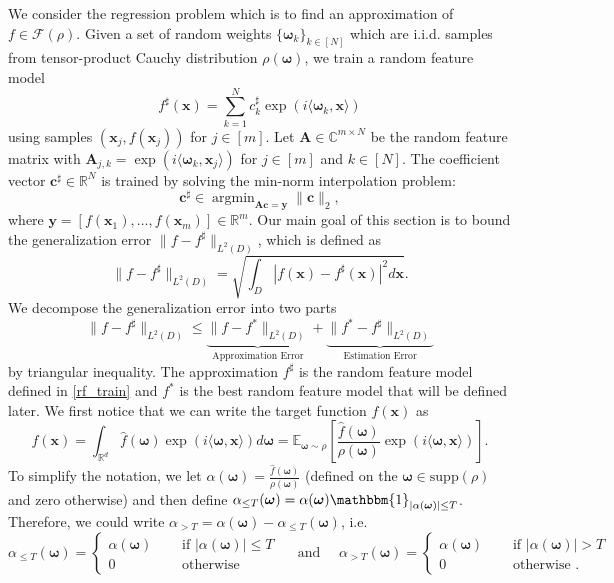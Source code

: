 \documentclass[11pt,twoside]{article}
\theoremstyle{plain}
\theoremstyle{definition}
\theoremstyle{remark}
\newcommand{\R}{\mathbb{R}}
\newcommand{\C}{\mathbb{C}}
\newcommand{\E}{\mathbb{E}}
\newcommand{\Ab}{\mathbf{A}}
\newcommand{\xb}{\mathbf{x}}
\newcommand{\yb}{\mathbf{y}}
\newcommand{\cb}{\mathbf{c}}
\newcommand{\Fc}{\mathcal{F}}
\newcommand{\argmin}{\mathop{\mathrm{argmin}}}
\newcommand{\indicator}{\mathbbm{1}}
\newcommand{\omegab}{\boldsymbol\omega}
\begin{document}
We consider the regression problem which is to find an approximation of $f\in\Fc(\rho)$. 
Given a set of random weights $\{ \omegab_k\}_{k\in[N]}$ which are i.i.d. samples from tensor-product Cauchy distribution $\rho(\omegab)$, we train a random feature model
\begin{equation}
\label{rf_train}
f^\sharp(\xb) = \sum_{k=1}^N c_k^\sharp \exp(i\langle \omegab_k,\xb\rangle)
\end{equation}
using samples $(\xb_j, f(\xb_j))$ for $j\in[m]$. 
Let $\Ab\in\C^{m\times N}$ be the random feature matrix with $\Ab_{j,k}=\exp(i\langle \omegab_k, \xb_j\rangle)$ for $j\in[m]$ and $k\in[N]$. The coefficient vector $\cb^\sharp\in\R^N$ is trained by solving the min-norm interpolation problem:
\begin{equation}
\cb^\sharp \in \argmin_{\Ab\cb = \yb} \|\cb\|_2,
\end{equation}
where $\yb = [f(\xb_1), \dots,f(\xb_m)]\in\R^m$.
Our main goal of this section is to bound the generalization error $\|f-f^\sharp\|_{L^2(D)}$, which is defined as
\begin{equation*}
\|f-f^\sharp\|_{L^2(D)} = \sqrt{ \int_{D} |f(\xb)-f^\sharp(\xb)|^2 d\xb}.
\end{equation*}
We decompose the generalization error into two parts
\begin{equation}
\|f-f^\sharp\|_{L^2(D)} \leq \underbrace{ \| f - f^* \|_{L^2(D)} }_{ \text{Approximation Error} } + \underbrace{ \|f^* - f^\sharp\|_{L^2(D)} }_{ \text{Estimation Error} }
\end{equation}
by triangular inequality. The approximation $f^\sharp$ is the random feature model defined in \eqref{rf_train} and $f^*$ is the best random feature model that will be defined later. 
We first notice that we can write the target function $f(\xb)$ as
\begin{equation}
\label{target_f}
f(\xb) = \int_{\R^d} \hat{f}(\omegab)\exp(i\langle \omegab, \xb\rangle)d\omegab = \E_{\omegab\sim\rho} \left[ \frac{\hat{f}(\omegab)}{\rho(\omegab)}\exp(i\langle \omegab, \xb\rangle) \right].
\end{equation}
To simplify the notation, we let $\alpha(\omegab) = \frac{\hat{f}(\omegab)}{\rho(\omegab)}$ (defined on the $\omegab \in \text{supp}(\rho)$ and zero otherwise) and then define $\alpha_{\leq T}(\omegab) = \alpha(\omegab)\indicator_{\left|\alpha(\omegab)\right|\leq T}$. Therefore, we could write $\alpha_{>T} = \alpha(\omegab) - \alpha_{\leq T}(\omegab) $, i.e.
$$
\alpha_{\leq T}(\omegab) = \begin{cases}
    \alpha(\omegab) \quad & \mbox{ if } \left|\alpha(\omegab) \right| \leq T \\
    0 \quad & \mbox{ otherwise }
\end{cases} \quad \mbox{ and } \quad
\alpha_{> T}(\omegab) = \begin{cases}
    \alpha(\omegab) \quad & \mbox{ if } \left|\alpha(\omegab) \right| > T \\
    0 \quad & \mbox{ otherwise }.
    \end{cases}
$$
\end{document}
